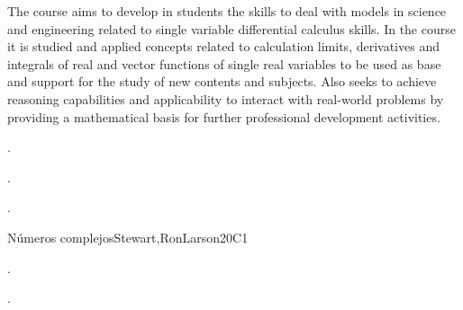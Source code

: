 \begin{syllabus}


\begin{justification}
The course aims to develop in students the skills to deal with models in science and engineering related to
single variable differential calculus skills. In the course it is studied and applied concepts related to calculation
limits, derivatives and integrals of real and vector functions of single real variables to be used as base and
support for the study of new contents and subjects. Also seeks to achieve reasoning capabilities and
applicability to interact with real-world problems by providing a mathematical basis for further professional
development activities.
\end{justification}

\begin{goals}
\item . %
\item . %
\item . %

\end{goals}

\begin{outcomes}
    \item {}
    \item {}
\end{outcomes}

\begin{competences}
    \item {}
    \item {}
    \item {}
\end{competences}

\begin{unit}{Números complejos}{}{Stewart,RonLarson}{20}{C1}
   \begin{topics}
    \item . %
    \item . %
   \end{topics}


\end{unit}
\end{syllabus}
